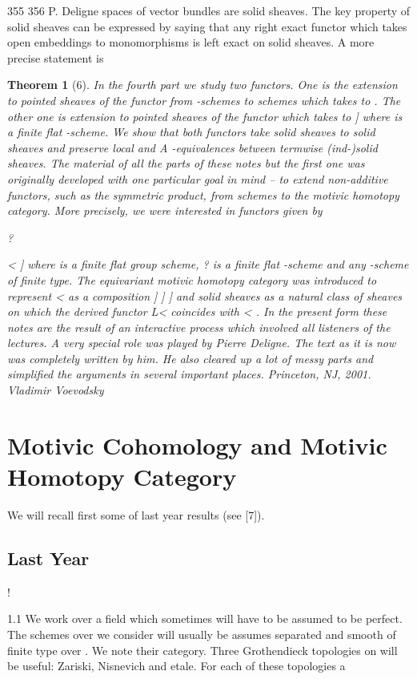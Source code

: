 \documentclass[11pt,a4paper]{article}
\theoremstyle{plain}
\newtheorem{theorem}{Theorem}
\theoremstyle{definition}
\begin{document}
355
356
P. Deligne
spaces of vector bundles are solid sheaves. The key property of solid sheaves can
be expressed by saying that any right exact functor which takes open embeddings
to monomorphisms is left exact on solid sheaves. A more precise statement is
\begin{theorem}[6]
In the fourth part we study two functors. One is the extension to pointed sheaves
of the functor from -schemes to schemes which takes to
. The other one
is extension to pointed sheaves of the functor which takes to ] where
is a
finite flat -scheme. We show that both functors take solid sheaves to solid sheaves
and preserve local and A -equivalences between termwise (ind-)solid sheaves.
The material of all the parts of these notes but the first one was originally developed with one particular goal in mind -- to extend non-additive functors, such as
the symmetric product, from schemes to the motivic homotopy category. More
precisely, we were interested in functors given by

 
 

?

<    ]  
where
is a finite flat group scheme, ? is a finite flat -scheme and  any
-scheme of finite type. The equivariant motivic homotopy category was introduced
to represent < as a composition
   ]   ]     ]  
and solid sheaves as a natural class of sheaves on which the derived functor L<
coincides with < .
In the present form these notes are the result of an interactive process which
involved all listeners of the lectures. A very special role was played by Pierre
Deligne. The text as it is now was completely written by him. He also cleared up a
lot of messy parts and simplified the arguments in several important places.
Princeton, NJ, 2001.
Vladimir Voevodsky

\end{theorem}

\section{Motivic Cohomology and Motivic Homotopy Category}

We will recall first some of last year results (see [7]).

\subsection{Last Year}


!

1.1 We work over a field which sometimes will have to be assumed to be perfect.
The schemes over we consider will usually be assumes separated and smooth of
finite type over . We note
their category. Three Grothendieck topologies on
will be useful: Zariski, Nisnevich and etale. For each of these topologies a
\end{document}
